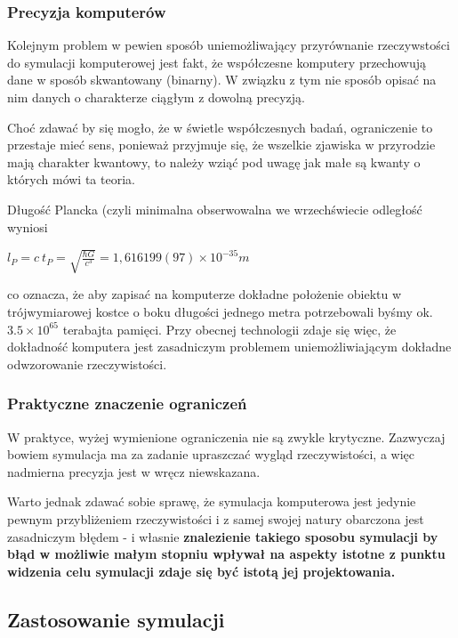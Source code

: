 \subsubsection{Precyzja komputerów}
\par{
Kolejnym problem w pewien sposób uniemożliwający przyrównanie rzeczywstości do symulacji komputerowej jest fakt, że współczesne komputery przechowują dane w sposób skwantowany (binarny). W związku z tym nie sposób opisać na nim danych o charakterze ciągłym z dowolną precyzją.
}
\par{
Choć zdawać by się mogło, że w świetle współczesnych badań, ograniczenie to przestaje mieć sens, ponieważ przyjmuje się, że wszelkie zjawiska w przyrodzie mają charakter kwantowy, to należy wziąć pod uwagę jak małe są kwanty o których mówi ta teoria.
}
\par{
Długość Plancka (czyli minimalna obserwowalna we wrzechświecie odległość wyniosi 
\begin{center}
$l_P = c \ t_P = \sqrt{\frac{\hbar G}{c^3}} = 1,616 199(97) \times 10^{-35} m$
\end{center}
co oznacza, że aby zapisać na komputerze dokładne położenie obiektu w trójwymiarowej kostce o boku długości jednego metra potrzebowali byśmy ok. $3.5 \times 10^{65}$ terabajta pamięci. Przy obecnej technologii zdaje się więc, że dokładność komputera jest zasadniczym problemem uniemożliwiającym dokładne odwzorowanie rzeczywistości.
}

\subsubsection{Praktyczne znaczenie ograniczeń}
\par{
W praktyce, wyżej wymienione ograniczenia nie są zwykle krytyczne. Zazwyczaj bowiem symulacja ma za zadanie upraszczać wygląd rzeczywistości, a więc nadmierna precyzja jest w wręcz niewskazana.
}
\par{
Warto jednak zdawać sobie sprawę, że symulacja komputerowa jest jedynie pewnym przybliżeniem rzeczywistości i z samej swojej natury obarczona jest zasadniczym błędem - i własnie \textbf{znalezienie takiego sposobu symulacji by błąd w możliwie małym stopniu wpływał na aspekty istotne z punktu widzenia celu symulacji zdaje się być istotą jej projektowania.}
}

\subsection{Zastosowanie symulacji}

